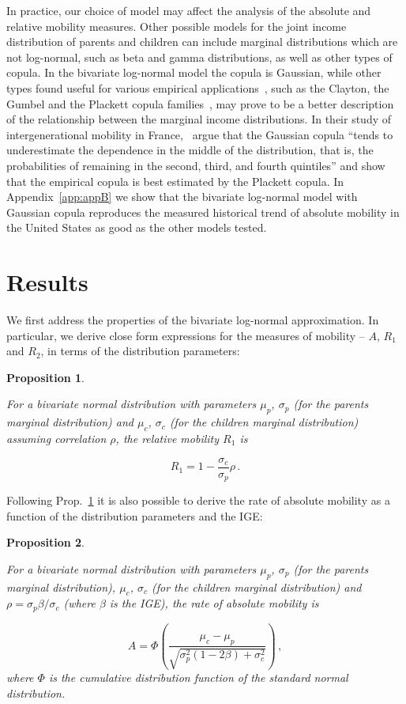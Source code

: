 \documentclass[12pt]{article}
\newtheorem{proposition}{Proposition}
\newcommand{\elabel}[1]{\label{eq:#1}}
\newcommand{\pref}[1]{Prop.~\ref{prop:#1}}
\newcommand{\be}{\begin{equation}}
\newcommand{\ee}{\end{equation}}
\numberwithin{equation}{section}
\begin{document}
In practice, our choice of model may affect the analysis of the absolute and relative mobility measures. Other possible models for the joint income distribution of parents and children can include marginal distributions which are not log-normal, such as beta and gamma distributions, as well as other types of copula. In the bivariate log-normal model the copula is Gaussian, while other types found useful for various empirical applications~\citep{trivedi2007copula}, such as the Clayton, the Gumbel and the Plackett copula families~\citep{bonhomme2009assessing}, may prove to be a better description of the relationship between the marginal income distributions. In their study of intergenerational mobility in France,~\citet{bonhomme2009assessing} argue that the Gaussian copula ``tends to underestimate the dependence in the middle of the distribution, that is, the probabilities of remaining in the second, third, and fourth quintiles'' and show that the empirical copula is best estimated by the Plackett copula. In Appendix~\ref{app:appB} we show that the bivariate log-normal model with Gaussian copula reproduces the measured historical trend of absolute mobility in the United States as good as the other models tested.

\section{Results}
\label{sec:results}

We first address the properties of the bivariate log-normal approximation. In particular, we derive close form expressions for the measures of mobility -- $A$, $R_1$ and $R_2$, in terms of the distribution parameters:

\begin{proposition}
\label{prop:prop1}

For a bivariate normal distribution with parameters $\mu_p$, $\sigma_p$ (for the parents marginal distribution) and $\mu_c$, $\sigma_c$ (for the children marginal distribution) assuming correlation $\rho$, the relative mobility $R_1$ is

\be
R_1 = 1-\frac{\sigma_c}{\sigma_p}\rho \,.
\elabel{beta_rho}
\ee
\end{proposition}

Following \pref{prop1} it is also possible to derive the rate of absolute mobility as a function of the distribution parameters and the IGE:

\begin{proposition}
\label{prop:prop2}

For a bivariate normal distribution with parameters $\mu_p$, $\sigma_p$ (for the parents marginal distribution), $\mu_c$, $\sigma_c$ (for the children marginal distribution) and $\rho=\sigma_p\beta/\sigma_c$ (where $\beta$ is the IGE), the rate of absolute mobility is

\be
A = \Phi\left(\frac{\mu_c - \mu_p}{\sqrt{\sigma_p^2\left(1 - 2\beta\right) + \sigma_c^2}}\right) \,,
\elabel{abs2}
\ee
where $\Phi$ is the cumulative distribution function of the standard normal distribution.
\end{proposition}
\end{document}
